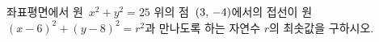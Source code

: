 좌표평면에서 원~$x^2+y^2=25$ 위의 점~$(3,\mkern3mu -4)$에서의 접선이 원~$(x-6)^2+(y-8)^2=r^2$과 만나도록 하는 자연수 $r$의 최솟값을 구하시오.
